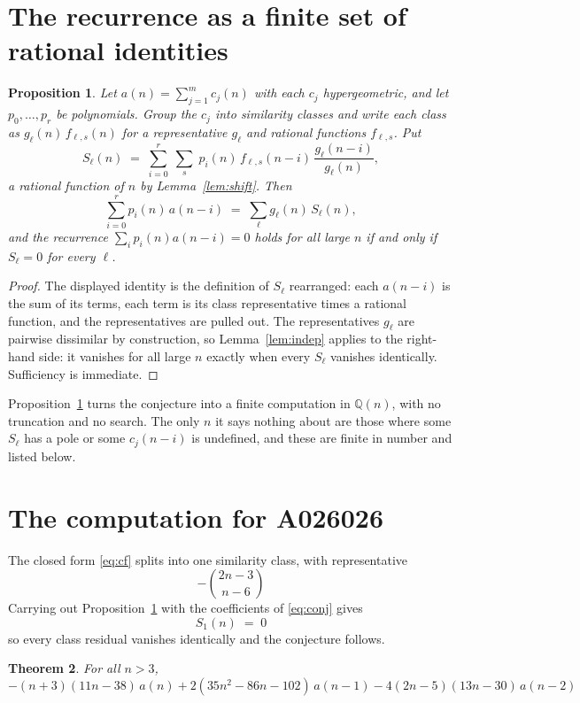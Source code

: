 \documentclass[11pt,a4paper]{article}
\theoremstyle{plain}
\newtheorem{theorem}{Theorem}
\newtheorem{proposition}[theorem]{Proposition}
\theoremstyle{definition}
\begin{document}
\section{The recurrence as a finite set of rational identities}

\begin{proposition}\label{prop:main}
Let $a(n)=\sum_{j=1}^{m}c_{j}(n)$ with each $c_{j}$ hypergeometric, and let
$p_{0},\dots,p_{r}$ be polynomials. Group the $c_{j}$ into similarity classes and write
each class as $g_{\ell}(n)\,f_{\ell,s}(n)$ for a representative $g_{\ell}$ and rational
functions $f_{\ell,s}$. Put
\[
S_{\ell}(n)\;=\;\sum_{i=0}^{r}\;\sum_{s}\;p_{i}(n)\,f_{\ell,s}(n-i)\,
\frac{g_{\ell}(n-i)}{g_{\ell}(n)} ,
\]
a rational function of $n$ by Lemma~\ref{lem:shift}. Then
\[
\sum_{i=0}^{r}p_{i}(n)\,a(n-i)\;=\;\sum_{\ell}g_{\ell}(n)\,S_{\ell}(n),
\]
and the recurrence $\sum_{i}p_{i}(n)a(n-i)=0$ holds for all large $n$ if and only if
$S_{\ell}=0$ for every $\ell$.
\end{proposition}

\begin{proof}
The displayed identity is the definition of $S_{\ell}$ rearranged: each $a(n-i)$ is the
sum of its terms, each term is its class representative times a rational function, and the
representatives are pulled out. The representatives $g_{\ell}$ are pairwise dissimilar by
construction, so Lemma~\ref{lem:indep} applies to the right-hand side: it vanishes for all
large $n$ exactly when every $S_{\ell}$ vanishes identically. Sufficiency is immediate.
\end{proof}

Proposition~\ref{prop:main} turns the conjecture into a finite computation in
$\mathbb{Q}(n)$, with no truncation and no search. The only $n$ it says nothing about are
those where some $S_{\ell}$ has a pole or some $c_{j}(n-i)$ is undefined, and these are
finite in number and listed below.

\section{The computation for A026026}

The closed form \eqref{eq:cf} splits into one similarity class, with
representative
\[
- {\binom{2 n - 3}{n - 6}}
\]
Carrying out Proposition~\ref{prop:main} with the coefficients of \eqref{eq:conj} gives
\[
S_{1}(n)\;=\;0
\]
so every class residual vanishes identically and the conjecture follows.

\begin{theorem}
For all $n> 3$,
\[
- \left(n + 3\right) \left(11 n - 38\right)\,a(n) + 2 \left(35 n^{2} - 86 n - 102\right)\,a(n-1) -  4 \left(2 n - 5\right) \left(13 n - 30\right)\,a(n-2)
\]
\end{theorem}
\end{document}
